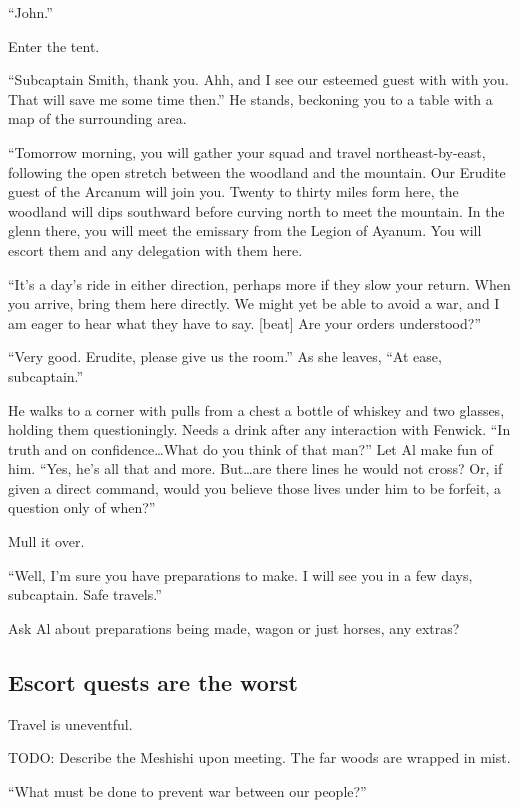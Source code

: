 \begin{multicols}{2}
``John.''

Enter the tent.

``Subcaptain Smith, thank you.
  Ahh, and I see our esteemed guest with with you.
  That will save me some time then.''
He stands, beckoning you to a table with a map of the surrounding area.

``Tomorrow morning, you will gather your squad and travel northeast-by-east,
    following the open stretch between the woodland and the mountain.
  Our Erudite guest of the Arcanum will join you.
  Twenty to thirty miles form here, the woodland will dips southward before curving north to meet
    the mountain.
  In the glenn there, you will meet the emissary from the Legion of Ayanum.
  You will escort them and any delegation with them here.

``It's a day's ride in either direction, perhaps more if they slow your return.
  When you arrive, bring them here directly.
  We might yet be able to avoid a war, and I am eager to hear what they have to say.
  [beat]
  Are your orders understood?''

``Very good.
  Erudite, please give us the room.''
As she leaves, ``At ease, subcaptain.''

He walks to a corner with pulls from a chest a bottle of whiskey and two glasses, holding them
  questioningly.
Needs a drink after any interaction with Fenwick.
``In truth and on confidence\ldots What do you think of that man?''
Let Al make fun of him.
``Yes, he's all that and more.
  But\ldots are there lines he would not cross?
  Or, if given a direct command, would you believe those lives under him to be forfeit, a question
    only of when?''

Mull it over.

``Well, I'm sure you have preparations to make.
  I will see you in a few days, subcaptain.
  Safe travels.''

Ask Al about preparations being made, wagon or just horses, any extras?

\subsection{Escort quests are the worst}

Travel is uneventful.

TODO: Describe the Meshishi upon meeting.
The far woods are wrapped in mist.

``What must be done to prevent war between our people?''


\end{multicols}
